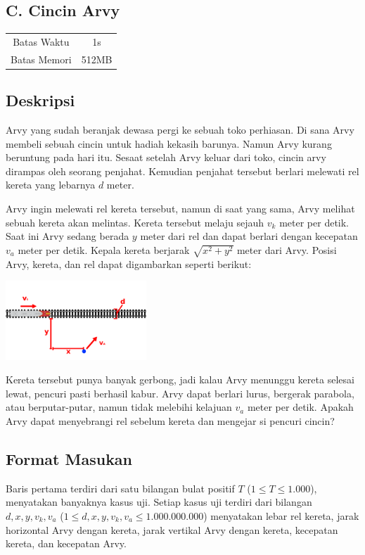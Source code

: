 \documentclass{article}
\begin{document}
\begin{center}
    \section*{C. Cincin Arvy}

    \begin{tabular}{ | c c | }
        \hline
        Batas Waktu  & 1s \\
        Batas Memori & 512MB \\
        \hline
    \end{tabular}
\end{center}

\subsection*{Deskripsi}

Arvy yang sudah beranjak dewasa pergi ke sebuah toko perhiasan.
Di sana Arvy membeli sebuah cincin untuk hadiah kekasih barunya.
Namun Arvy kurang beruntung pada hari itu.
Sesaat setelah Arvy keluar dari toko, cincin arvy dirampas oleh seorang penjahat.
Kemudian penjahat tersebut berlari melewati rel kereta yang lebarnya $d$ meter.

Arvy ingin melewati rel kereta tersebut, namun di saat yang sama, Arvy melihat sebuah kereta akan melintas.
Kereta tersebut melaju sejauh $v_k$ meter per detik.
Saat ini Arvy sedang berada $y$ meter dari rel dan dapat berlari dengan kecepatan $v_a$ meter per detik.
Kepala kereta berjarak $\sqrt{x^2+y^2}$ meter dari Arvy.
Posisi Arvy, kereta, dan rel dapat digambarkan seperti berikut:

\begin{center}
    \includegraphics[width=200px]{skema}
\end{center}

Kereta tersebut punya banyak gerbong, jadi kalau Arvy menunggu kereta selesai lewat, pencuri pasti berhasil kabur.
Arvy dapat berlari lurus, bergerak parabola, atau berputar-putar, namun tidak melebihi kelajuan $v_a$ meter per detik.
Apakah Arvy dapat menyebrangi rel sebelum kereta dan mengejar si pencuri cincin?

\subsection*{Format Masukan}
Baris pertama terdiri dari satu bilangan bulat positif $T$ ($1 \leq T \leq 1.000$), menyatakan banyaknya kasus uji.
Setiap kasus uji terdiri dari bilangan $d, x, y, v_k, v_a$ ($1 \leq d, x, y, v_k, v_a \leq 1.000.000.000$) menyatakan lebar rel kereta, jarak horizontal Arvy dengan kereta, jarak vertikal Arvy dengan kereta, kecepatan kereta, dan kecepatan Arvy.
\end{document}
